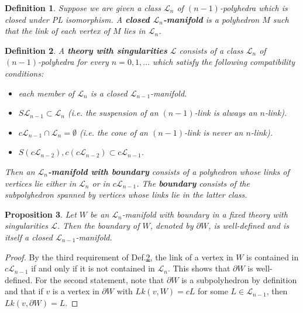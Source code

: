 \documentclass{scrreprt}
\newtheorem{prop}{Proposition}[chapter]
\newtheorem{definition}[prop]{Definition}
\begin{document}
\begin{definition}
Suppose we are given a class $\mathcal{L}_n$ of $(n-1)$-polyhedra which is closed under PL isomorphism. A \textbf{closed $\mathcal{L}_n$-manifold} is a polyhedron $M$ such that the link of each vertex of $M$ lies in $\mathcal{L}_n$. 
\end{definition}

\begin{definition}\label{theory}
A \textbf{theory with singularities} $\mathcal{L}$ consists of a class $\mathcal{L}_n$ of $(n-1)$-polyhedra for every $n=0,1,...$ which satisfy the following compatibility conditions:
\begin{itemize}
\item[1.] each member of $\mathcal{L}_n$ is a closed $\mathcal{L}_{n-1}$-manifold.
\item[2.] $S \mathcal{L}_{n-1} \subset \mathcal{L}_n$ (i.e. the suspension of an $(n-1)$-link is always an $n$-link).
\item[3.] $c \mathcal{L}_{n-1} \cap \mathcal{L}_n = \emptyset$ (i.e. the cone of an $(n-1)$-link is never an $n$-link).
\item[4.] $S(c\mathcal{L}_{n-2}), c(c \mathcal{L}_{n-2}) \subset c \mathcal{L}_{n-1}$.
\end{itemize}
Then an \textbf{$\mathcal{L}_n$-manifold with boundary} consists of a polyhedron whose links of vertices lie either in $\mathcal{L}_n$ or in $c \mathcal{L}_{n-1}$. The \textbf{boundary} consists of the subpolyhedron spanned by vertices whose links lie in the latter class.
\end{definition}

\begin{prop}
Let $W$ be an $\mathcal{L}_n$-manifold with boundary in a fixed theory with singularities $\mathcal{L}$. Then the boundary of $W$, denoted by $\partial W$, is well-defined and is itself a closed $\mathcal{L}_{n-1}$-manifold.
\end{prop}

\begin{proof}
By the third requirement of Def.\ref{theory}, the link of a vertex in $W$ is contained in $c \mathcal{L}_{n-1}$ if and only if it is not contained in $\mathcal{L}_n$. This shows that $\partial W$ is well-defined. For the second statement, note that $\partial W$ is a subpolyhedron by definition and that if $v$ is a vertex in $\partial W$ with $Lk(v,W)=cL$ for some $L \in \mathcal{L}_{n-1}$, then $Lk(v,\partial W) = L$.
\end{proof}
\end{document}

